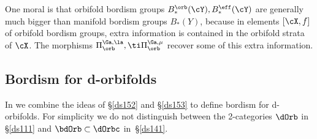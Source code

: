 \documentclass{article}
\begin{document}
One moral is that orbifold bordism groups $B_*^\orb(\cY),
B_*^\eff(\cY)$ are generally much bigger than manifold bordism
groups $B_*(Y)$, because in elements $[\cX,f]$ of orbifold bordism
groups, extra information is contained in the orbifold strata of
$\cX$. The morphisms $\Pi_\orb^{\Ga,\la},\ti\Pi{}_\orb^{\Ga,\mu}$
recover some of this extra information.

\subsection{Bordism for d-orbifolds}
\label{ds154}

In \cite[\S 13.4]{Joyc6} we combine the ideas of \S\ref{ds152} and
\S\ref{ds153} to define bordism for d-orbifolds. For simplicity we
do not distinguish between the 2-categories $\dOrb$ in \S\ref{ds111}
and $\bdOrb\subset\dOrbc$ in~\S\ref{ds141}.
\end{document}
